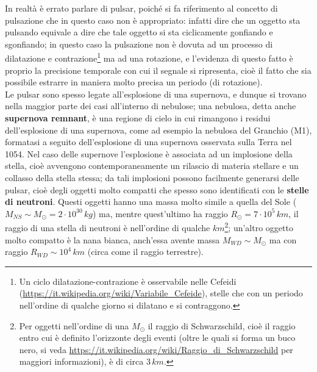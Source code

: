 In realtà è errato parlare di pulsar, poiché si fa riferimento al concetto di pulsazione che in questo caso non è appropriato: infatti dire che un oggetto sta pulsando equivale a dire che tale oggetto si sta ciclicamente gonfiando e sgonfiando; in questo caso la pulsazione non è dovuta ad un processo di dilatazione e contrazione\footnote{Un ciclo dilatazione-contrazione è osservabile nelle Cefeidi (\url{https://it.wikipedia.org/wiki/Variabile_Cefeide}), stelle che con un periodo nell'ordine di qualche giorno si dilatano e si contraggono.} ma ad una rotazione, e l'evidenza di questo fatto è proprio la precisione temporale con cui il segnale si ripresenta, cioè il fatto che sia possibile estrarre in maniera molto precisa un periodo (di rotazione).\\
Le pulsar sono spesso legate all'esplosione di una supernova, e dunque si trovano nella maggior parte dei casi all'interno di nebulose; una nebulosa, detta anche \textbf{supernova remnant}, è una regione di cielo in cui rimangono i residui dell'esplosione di una supernova, come ad esempio la nebulosa del Granchio (M1), formatasi a seguito dell'esplosione di una supernova osservata sulla Terra nel 1054. Nel caso delle supernove l'esplosione è associata ad un implosione della stella, cioè avvengono contemporaneamente un rilascio di materia stellare e un collasso della stella stessa; da tali implosioni possono facilmente generarsi delle pulsar, cioè degli oggetti molto compatti che spesso sono identificati con le \textbf{stelle di neutroni}. Questi oggetti hanno una massa molto simile a quella del Sole ($M_{NS} \sim M_{\odot}=2 \cdot 10^30 \, kg$) ma, mentre quest'ultimo ha raggio $R_{\odot}= 7 \cdot 10^5 \, km$, il raggio di una stella di neutroni è nell'ordine di qualche $km$\footnote{Per oggetti nell'ordine di una $M_{\odot}$ il raggio di Schwarzschild, cioè il raggio entro cui è definito l'orizzonte degli eventi (oltre le quali si forma un buco nero, si veda \url{https://it.wikipedia.org/wiki/Raggio_di_Schwarzschild} per maggiori informazioni), è di circa $3 \, km$.}; un'altro oggetto molto compatto è la nana bianca, anch'essa avente massa $M_{WD} \sim M_{\odot}$ ma con raggio $R_{WD} \sim 10^4 \, km$ (circa come il raggio terrestre).

\clearpage



